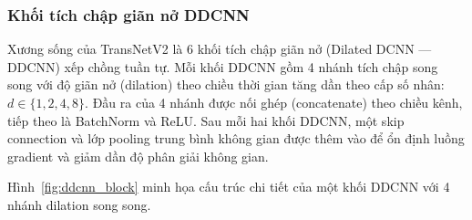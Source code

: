 \subsubsection{Khối tích chập giãn nở DDCNN}
\label{subsubsec:ddcnn}

Xương sống của TransNetV2 là 6 khối tích chập giãn nở (Dilated DCNN — DDCNN) xếp chồng tuần tự. Mỗi khối DDCNN gồm 4 nhánh tích chập song song với độ giãn nở (dilation) theo chiều thời gian tăng dần theo cấp số nhân: $d \in \{1, 2, 4, 8\}$. Đầu ra của 4 nhánh được nối ghép (concatenate) theo chiều kênh, tiếp theo là BatchNorm và ReLU. Sau mỗi hai khối DDCNN, một skip connection và lớp pooling trung bình không gian được thêm vào để ổn định luồng gradient và giảm dần độ phân giải không gian.

Hình~\ref{fig:ddcnn_block} minh họa cấu trúc chi tiết của một khối DDCNN với 4 nhánh dilation song song.

